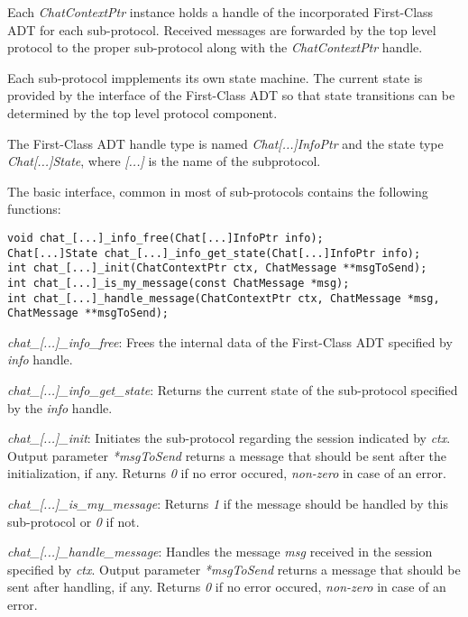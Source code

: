 Each \emph{ChatContextPtr} instance holds a handle of the incorporated First-Class ADT for each sub-protocol. Received messages are forwarded by the top level protocol to the proper sub-protocol along with the \emph{ChatContextPtr} handle.

Each sub-protocol impplements its own state machine. The current state is provided by the interface of the First-Class ADT so that state transitions can be determined by the top level protocol component.

The First-Class ADT handle type is named \emph{Chat[...]InfoPtr} and the state type \emph{Chat[...]State}, where \emph{[...]} is the name of the subprotocol.

The basic interface, common in most of sub-protocols contains the following functions:

\begin{lstlisting}[caption={General sub-protocol interface},label={lst:subprotocol-interface}]
void chat_[...]_info_free(Chat[...]InfoPtr info);
Chat[...]State chat_[...]_info_get_state(Chat[...]InfoPtr info);
int chat_[...]_init(ChatContextPtr ctx, ChatMessage **msgToSend);
int chat_[...]_is_my_message(const ChatMessage *msg);
int chat_[...]_handle_message(ChatContextPtr ctx, ChatMessage *msg, ChatMessage **msgToSend);
\end{lstlisting}

\begin{description}
  \item \emph{chat\_[...]\_info\_free}: Frees the internal data of the First-Class ADT specified by \emph{info} handle.

  \item \emph{chat\_[...]\_info\_get\_state}: Returns the current state of the sub-protocol specified by the \emph{info} handle.

  \item \emph{chat\_[...]\_init}: Initiates the sub-protocol regarding the session indicated by \emph{ctx}. Output parameter \emph{*msgToSend} returns a message that should be sent after the initialization, if any. Returns \emph{0} if no error occured, \emph{non-zero} in case of an error. 

  \item \emph{chat\_[...]\_is\_my\_message}: Returns \emph{1} if the message should be handled by this sub-protocol or \emph{0} if not.

  \item \emph{chat\_[...]\_handle\_message}: Handles the message \emph{msg} received in the session specified by \emph{ctx}. Output parameter \emph{*msgToSend} returns a message that should be sent after handling, if any. Returns \emph{0} if no error occured, \emph{non-zero} in case of an error. 
\end{description}

